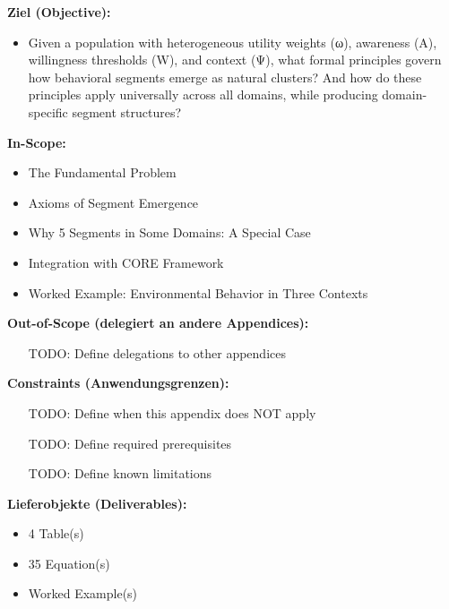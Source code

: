 \begin{tcolorbox}[
    colback=orange!5!white,
    colframe=orange!75!black,
    title={\textbf{Appendix Scope: Ziel / In-Scope / Out-of-Scope / Constraints}},
    fonttitle=\bfseries
]

\textbf{Ziel (Objective):}
\begin{itemize}[nosep]
    \item Given a population with heterogeneous utility weights (ω), awareness (A),
willingness thresholds (W), and context (Ψ), what formal principles govern how
behavioral segments emerge as natural clusters? And how do these principles
apply universally across all domains, while producing domain-specific segment
structures?
\end{itemize}

\textbf{In-Scope:}
\begin{itemize}[nosep]
    \item The Fundamental Problem
    \item Axioms of Segment Emergence
    \item Why 5 Segments in Some Domains: A Special Case
    \item Integration with CORE Framework
    \item Worked Example: Environmental Behavior in Three Contexts
\end{itemize}

\textbf{Out-of-Scope (delegiert an andere Appendices):}
\begin{itemize}[nosep]
    \item [TODO: Define delegations to other appendices]
\end{itemize}

\textbf{Constraints (Anwendungsgrenzen):}
\begin{itemize}[nosep]
    \item [TODO: Define when this appendix does NOT apply]
    \item [TODO: Define required prerequisites]
    \item [TODO: Define known limitations]
\end{itemize}

\textbf{Lieferobjekte (Deliverables):}
\begin{itemize}[nosep]
    \item 4 Table(s)
    \item 35 Equation(s)
    \item Worked Example(s)
\end{itemize}

\end{tcolorbox}


